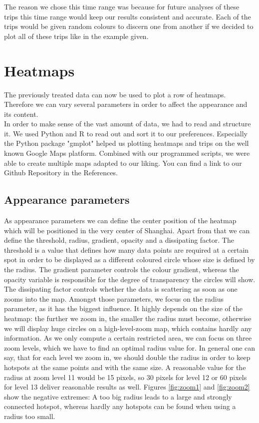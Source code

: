\documentclass[11pt,conference,a4paper,twocolumns,romanappendices]{IEEEtran}
\begin{document}
The reason we chose this time range was because for future analyses of these trips this time range would keep our results consistent and accurate. Each of the trips would be given random colours to discern one from another if we decided to plot all of these trips like in the example given. \\

\section{Heatmaps}
The previously treated data can now be used to plot a row of heatmaps. Therefore we can vary several parameters in order to affect the appearance and its content.\\
In order to make sense of the vast amount of data, we had to read and structure it. We used Python and R to read out and sort it to our preferences. Especially the Python package "gmplot" \cite{gmplot} helped us plotting heatmaps and trips on the well known Google Maps platform. Combined with our programmed scripts, we were able to create multiple maps adapted to our liking. You can find a link to our Github Repository in the References. \cite{github-IoTTrace} \\
\subsection{Appearance parameters}
As appearance parameters we can define the center position of the heatmap which will be positioned in the very center of Shanghai. Apart from that we can define the threshold, radius, gradient, opacity and a dissipating factor. The threshold is a value that defines how many data points are required at a certain spot in order to be displayed as a different coloured circle whose size is defined by the radius. The gradient parameter controls the colour gradient, whereas the opacity variable is responsible for the degree of transparency the circles will show. The dissipating factor controls whether the data is scattering as soon as one zooms into the map.
Amongst those parameters, we focus on the radius parameter, as it has the biggest influence. It highly depends on the size of the heatmap: the further we zoom in, the smaller the radius must become, otherwise we will display huge circles on a high-level-zoom map, which contains hardly any information. As we only compute a certain restricted area, we can focus on three zoom levels, which we have to find an optimal radius value for. In general one can say, that for each level we zoom in, we should double the radius in order to keep hotspots at the same points and with the same size. A reasonable value for the radius at zoom level 11 would be 15 pixels, so 30 pixels for level 12 or 60 pixels for level 13 deliver reasonable results as well. Figures \ref{fig:zoom1} and \ref{fig:zoom2} show the negative extremes: A too big radius leads to a large and strongly connected hotspot, whereas hardly any hotspots can be found when using a radius too small.
\end{document}
